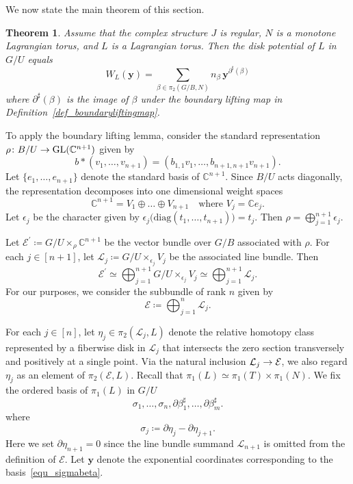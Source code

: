 \documentclass[11pt]{amsart}
\theoremstyle{plain}
\newtheorem{theorem}{Theorem}[section]
\theoremstyle{definition}
\theoremstyle{remark}
\numberwithin{equation}{section} \numberwithin{table}{section}
\def\to{\mathchoice{\longrightarrow}{\rightarrow}{\rightarrow}{\rightarrow}}
\numberwithin{equation}{section}
\begin{document}
We now state the main theorem of this section.

\begin{theorem}\label{theorem_maintheorem2}
Assume that the complex structure $J$ is regular, $N$ is a monotone Lagrangian torus, and $L$ is a Lagrangian torus. Then the disk potential of $L$ in $G/U$ equals
\begin{equation}\label{equ_diskpoWLGU}
W_L (\mathbf{y}) = \sum_{\beta \in \pi_2(G/B, N)} n_\beta \, \mathbf{y}^{\partial^{\sharp}(\beta)}
\end{equation}
where $\partial^{\sharp}(\beta)$ is the image of $\beta$ under the boundary lifting map in Definition~\ref{def_boundaryliftingmap}.
\end{theorem}

To apply the boundary lifting lemma, consider the standard representation $\rho \colon B/U \to \mathrm{GL}(\mathbb{C}^{n+1})$ given by
$$
b * (v_1, \dots, v_{n+1}) = (b_{1,1} v_1, \dots, b_{n+1,n+1}v_{n+1}).
$$
Let $\{ e_1, \dots, e_{n+1} \}$ denote the standard basis of $\mathbb{C}^{n+1}$. Since $B/U$ acts diagonally, the representation decomposes into one dimensional weight spaces
$$
\mathbb{C}^{n+1} = V_1 \oplus \dots \oplus V_{n+1} \quad \mbox{where $V_j = \mathbb{C} e_j$.}
$$
Let $\epsilon_j$ be the character given by $\epsilon_j \bigl( \mathrm{diag}(t_1, \dots, t_{n+1}) \bigr) = t_j$. Then $\rho = \bigoplus_{j=1}^{n+1} \epsilon_j$.

Let $\mathcal{E}^\prime \coloneqq G/U \times_{\rho} \mathbb{C}^{n+1}$ be the vector bundle over $G/B$ associated with $\rho$. For each $j \in [n+1]$, let $\mathcal{L}_j \coloneqq G/U \times_{\epsilon_j} V_j$ be the associated line bundle. Then
\begin{equation}\label{equ_decompositionline}
\mathcal{E}^\prime \simeq \bigoplus_{j=1}^{n+1}  G/U \times_{\epsilon_j} V_j \simeq \bigoplus_{j=1}^{n+1} \mathcal{L}_j.
\end{equation}
For our purposes, we consider the subbundle of rank $n$ given by
$$
\mathcal{E} \coloneqq \bigoplus_{j=1}^{n} \mathcal{L}_j.
$$

For each $j \in [n]$, let $\eta_j \in \pi_2(\mathcal{L}_j,L)$ denote the relative homotopy class represented by a fiberwise disk in $\mathcal{L}_j$ that intersects the zero section transversely and positively at a single point. Via the natural inclusion $\mathcal{L}_j \to \mathcal{E}$, we also regard $\eta_j$ as an element of $\pi_2(\mathcal{E},L)$. Recall that $\pi_1(L) \simeq \pi_1(T) \times \pi_1(N)$. We fix the ordered basis of $\pi_1(L)$ in $G/U$
\begin{equation}\label{equ_sigmabeta}
\sigma_1, \dots, \sigma_n, \partial \beta_1^\sharp, \dots, \partial \beta_m^\sharp.
\end{equation}
where
\begin{equation}\label{equ_identificationofact}
\sigma_j \coloneqq \partial \eta_{j} - \partial \eta_{j+1}.
\end{equation}
Here we set $\partial \eta_{n+1} = 0$ since the line bundle summand $\mathcal{L}_{n+1}$ is omitted from the definition of $\mathcal{E}$. Let $\mathbf{y}$ denote the exponential coordinates corresponding to the basis~\eqref{equ_sigmabeta}. 
\end{document}
